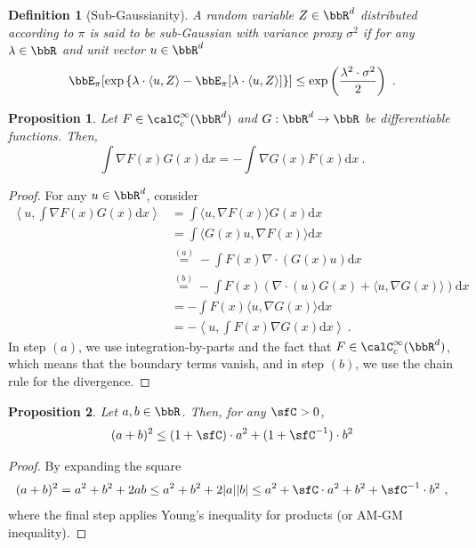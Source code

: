 \documentclass[11pt]{article}
\newtheorem{definition}{Definition}[section]
\newtheorem{proposition}{Proposition}[section]
\newcounter{ct}
\newcommand{\rmd}{\mathrm{d}}
\newcommand{\cssf}[1]{\calC_{c}^{\infty}(#1)}
\begin{document}
\begin{definition}[Sub-Gaussianity]
A random variable \(Z \in \bbR^{d}\) distributed according to \(\pi\) is said to be \emph{sub-Gaussian with variance proxy \(\sigma^{2}\)} if for any \(\lambda \in \bbR\) and unit vector \(u \in \bbR^{d}\)
\begin{equation*}
    \bbE_{\pi}[\exp\left\{\lambda \cdot \langle u, Z\rangle - \bbE_{\pi}[\lambda \cdot \langle u, Z\rangle]\right\}] \leq \exp\left(\frac{\lambda^{2} \cdot \sigma^{2}}{2}\right)~.
\end{equation*}
\end{definition}

\begin{proposition}
\label{prop:ibp}
Let \(F \in \cssf{\bbR^{d}}\) and \(G : \bbR^{d} \to \bbR\) be differentiable functions.
Then,
\begin{equation*}
    \int \nabla F(x) G(x) \rmd x = -\int \nabla G(x) F(x) \rmd x~.
\end{equation*}
\end{proposition}
\begin{proof}
    For any \(u \in \bbR^{d}\), consider
    \begin{align*}
        \left\langle u, \int \nabla F(x) G(x) \rmd x\right\rangle &= \int \langle u, \nabla F(x)\rangle G(x) \rmd x \\
        &= \int \langle G(x) u, \nabla F(x)\rangle \rmd x \\
        &\overset{(a)}= -\int F(x) \nabla \cdot (G(x)u)\rmd x\\
        &\overset{(b)}= -\int F(x) (\nabla \cdot (u) G(x) + \langle u, \nabla G(x)\rangle) \rmd x \\
        &= -\int F(x) \langle u, \nabla G(x)\rangle \rmd x \\
        &= -\left\langle u, \int F(x) \nabla G(x) \rmd x\right\rangle~.
    \end{align*}
    In step \((a)\), we use integration-by-parts and the fact that \(F \in \cssf{\bbR^{d}}\), which means that the boundary terms vanish, and in step \((b)\), we use the chain rule for the divergence.
\end{proof}

\begin{proposition}
\label{prop:youngs-square}
Let \(a, b \in \bbR\).
Then, for any \(\sfC > 0\),
\begin{equation*}
    (a + b)^{2} \leq (1 + \sfC) \cdot a^{2} + (1 + \sfC^{-1}) \cdot b^{2}
\end{equation*}
\end{proposition}
\begin{proof}
By expanding the square
\begin{equation*}
    (a + b)^{2} = a^{2} + b^{2} + 2ab \leq a^{2} + b^{2} + 2|a||b| \leq a^{2} + \sfC \cdot a^{2} + b^{2} + \sfC^{-1} \cdot b^{2}~,
\end{equation*}
where the final step applies Young's inequality for products (or AM-GM inequality).
\end{proof}
\end{document}
